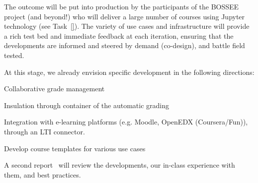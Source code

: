 \begin{task}[
  title=Teaching tools, infrastructure, and best practices,
  id=teaching-tools,
  lead=EP,
  PM=20, %
  wphases={0-36},
  partners={EP,UPSUD}]
  The outcome will be put into production by the participants of the
  BOSSEE project (and beyond!) who will deliver a large number of
  courses using Jupyter technology (see Task~\ref{}). The variety of
  use cases and infrastructure will provide a rich test bed and
  immediate feedback at each iteration, ensuring that the developments
  are informed and steered by demand (co-design), and battle field
  tested.

  At this stage, we already envision specific development in the
  following directions:
  \begin{compactitem}
  \item Collaborative grade management
  \item Insulation through container of the automatic grading
  \item Integration with e-learning platforms (e.g. Moodle, OpenEDX
    (Coursera/Fun)), through an LTI connector.
  \item Develop course templates for various use cases
  \end{compactitem}

  A second report~ will review the
  developments, our in-class experience with them, and best practices.
\end{task}
